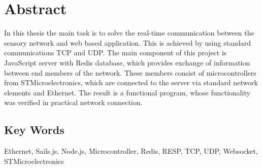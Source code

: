 \chapter*{Abstract}
In this thesis the main task is to solve the real-time communication between the sensory network and web based application. This is achieved by using standard communications TCP and UDP. The main component of this project is JavaScript server with Redis database, which provides exchange of information between end members of the network. These members consist of microcontrollers from STMicroelectronics, which are connected to the server via standard network elements and Ethernet. The result is a functional program, whose functionality was verified in practical network connection.

\vfill

\section*{Key Words}
Ethernet, Sails.js, Node.js, Microcontroller, Redis, RESP, TCP, UDP, Websocket, STMicroelectronics